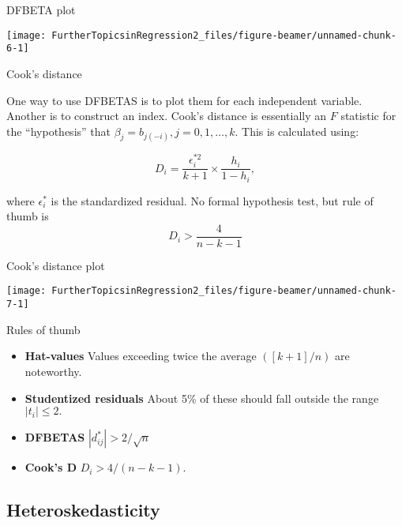 \documentclass[10pt,ignorenonframetext,]{beamer}
\providecommand{\tightlist}{%
  \setlength{\itemsep}{0pt}\setlength{\parskip}{0pt}}
\begin{document}
\begin{frame}{DFBETA plot}

\begin{center}\texttt{[image: FurtherTopicsinRegression2\_files/figure-beamer/unnamed-chunk-6-1]} \end{center}

\end{frame}

\begin{frame}{Cook's distance}

One way to use DFBETAS is to plot them for each independent variable.
Another is to construct an index. Cook's distance is essentially an
\(F\) statistic for the ``hypothesis'' that
\(\beta_j = b_{j(-i)}, j=0,1,\dots,k.\) This is calculated using:

\[
D_i = \frac{\epsilon^{*2}_i}{k+1} \times \frac{h_i}{1-h_i},
\]

where \(\epsilon^*_i\) is the standardized residual. No formal
hypothesis test, but rule of thumb is \[
D_i > \frac{4}{n-k-1}
\]

\end{frame}

\begin{frame}{Cook's distance plot}

\begin{center}\texttt{[image: FurtherTopicsinRegression2\_files/figure-beamer/unnamed-chunk-7-1]} \end{center}

\end{frame}

\begin{frame}{Rules of thumb}

\begin{itemize}
\tightlist
\item
  \textbf{Hat-values} Values exceeding twice the average \(([k+1]/n)\)
  are noteworthy.
\item
  \textbf{Studentized residuals} About 5\% of these should fall outside
  the range \(|t_i| \le 2.\)
\item
  \textbf{DFBETAS} \(|d_{ij}^*| > 2/\sqrt{n}\)
\item
  \textbf{Cook's D} \(D_i > 4/(n - k - 1).\)
\end{itemize}

\end{frame}

\subsection{Heteroskedasticity}\label{heteroskedasticity}
\end{document}
